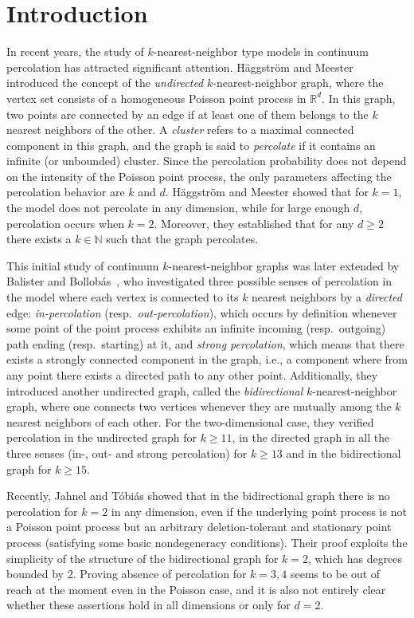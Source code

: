 \documentclass[a4paper, oneside, 11pt]{amsart}
\newcommand{\N}{\mathbb{N}}
\theoremstyle{definition}
\newcommand{\1}{\mathbbm{1}}
\newcommand{\0}{\mathbf{o}}
\numberwithin{equation}{section}
\begin{document}
\section{Introduction}
In recent years, the study of $k$-nearest-neighbor type models in continuum percolation has attracted significant attention. Häggström and Meester \cite{HaggMee96} introduced the concept of the \emph{undirected} $k$-nearest-neighbor graph, where the vertex set consists of a homogeneous Poisson point process in $\mathbb{R}^d$. In this graph, two points are connected by an edge if at least one of them belongs to the $k$ nearest neighbors of the other. A \emph{cluster} refers to a maximal connected component in this graph, and the graph is said to \emph{percolate} if it contains an infinite (or unbounded) cluster. Since the percolation probability does not depend on the intensity of the Poisson point process, the only parameters affecting the percolation behavior are $k$ and $d$. 
Häggström and Meester showed that for $k = 1$, the model does not percolate in any dimension, while for large enough $d$, percolation occurs when $k = 2$. Moreover, they established that for any $d \geq 2$ there exists a $k \in \N$ such that the graph percolates. 

This initial study of continuum $k$-nearest-neighbor graphs was later extended by Balister and Bollobás~\cite{BalisterBollobas13}, who investigated three possible senses of percolation in the model where each vertex is connected  to its $k$ nearest neighbors by a \emph{directed} edge: \emph{in-percolation} (resp.~\emph{out-percolation}), which occurs by definition whenever some point of the point process exhibits an infinite incoming (resp.\ outgoing) path ending (resp.\ starting) at it, and \emph{strong percolation}, which means that there exists a strongly connected component in the graph, i.e., a component where from any point there exists a directed path to any other point.
Additionally, they introduced another undirected graph, called the \emph{bidirectional} $k$-nearest-neighbor graph, where one connects two vertices whenever they are mutually among the $k$ nearest neighbors of each other. For the two-dimensional case, they verified percolation in the undirected graph for $k \geq 11$, in the directed graph in all the three senses (in-, out- and strong percolation) for $k \geq 13$ and in the bidirectional graph for $k \geq 15$.

Recently, Jahnel and T\'obi\'as \cite{JT22} showed that in the bidirectional graph there is no percolation for $k=2$ in any dimension, even if the underlying point process is not a Poisson point process but an arbitrary deletion-tolerant and stationary point process (satisfying some basic nondegeneracy conditions). Their proof exploits the simplicity of the structure of the bidirectional graph for $k=2$, which has degrees bounded by 2. Proving absence of percolation for $k=3,4$ seems to be out of reach at the moment even in the Poisson case, and it is also not entirely clear whether these assertions hold in all dimensions or only for $d=2$.
\end{document}
